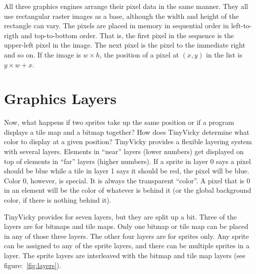 All three graphics engines arrange their pixel data in the same manner. They all use rectangular raster images as a base, although the width and height of the rectangle can vary. The pixels are placed in memory in sequential order in left-to-rigth and top-to-bottom order. That is, the first pixel in the sequence is the upper-left pixel in the image. The next pixel is the pixel to the immediate right and so on. If the image is $w \times h$, the position of a pixel at $(x, y)$ in the list is $y \times w + x$.

\section{Graphics Layers}

Now, what happens if two sprites take up the same position or if a program displays a tile map and a bitmap together? How does TinyVicky determine what color to display at a given position? TinyVicky provides a flexible layering system with several layers. Elements in ``near'' layers (lower numbers) get displayed on top of elements in ``far'' layers (higher numbers). If a sprite in layer 0 says a pixel should be blue while a tile in layer 1 says it should be red, the pixel will be blue. Color 0, however, is special. It is always the transparent ``color''. A pixel that is 0 in an element will be the color of whatever is behind it (or the global background color, if there is nothing behind it).

TinyVicky provides for seven layers, but they are split up a bit. Three of the layers are for bitmaps and tile maps. Only one bitmap or tile map can be placed in any of those three layers. The other four layers are for sprites only. Any sprite can be assigned to any of the sprite layers, and there can be multiple sprites in a layer. The sprite layers are interleaved with the bitmap and tile map layers (see figure:~\ref{fig:layers}).

